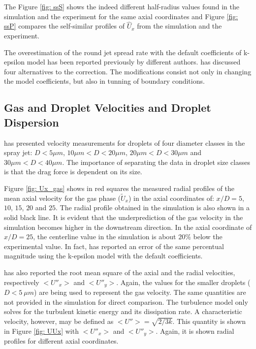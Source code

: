 \documentclass[preprint,12pt,review]{elsarticle}
\begin{document}
The Figure \ref{fig: ssS} shows the indeed different half-radius values found in the simulation and the experiment for the same axial coordinates and Figure \ref{fig: ssP} compares the self-similar profiles of $\hat{U}_x$ from the simulation and the experiment.

The overestimation of the round jet spread rate with the default coefficients of k-epsilon model has been reported previously by different authors. \citet{luppes} has discussed four alternatives to the correction. The modifications consist not only in changing the model coefficients, but also in tunning of boundary conditions. 

\subsection{Gas and Droplet Velocities and Droplet Dispersion}

\citet{chen} has presented velocity measurements for droplets of four diameter classes in the spray jet: $D< 5\mu m$, $10\mu m <D<20\mu m$, $20 \mu m < D < 30 \mu m$ and $30 \mu m < D < 40 \mu m$. The importance of separating the data in droplet size classes is that the drag force is dependent on its size. 

Figure \ref{fig: Ux_gas} shows in red squares the measured radial profiles of the mean axial velocity for the gas phase ($\tilde{U}_x$) in the axial coordinates of: $x/D=5$, $10$, $15$, $20$ and $25$. The radial profile obtained in the simulation is also shown in a solid black line. It is evident that the underprediction of the gas velocity in the simulation becomes higher in the downstream direction. In the axial coordinate of $x/D=25$, the centerline value in the simulation is about $20\%$ below the experimental value. In fact, \citet{luppes} has reported an error of the same percentual magnitude using the k-epsilon model with the default coefficients. 

\citet{chen} has also reported the root mean square of the axial and the radial velocities, respectively $<U''_x>$ and $<U''_y>$. Again, the values for the smaller droplets ($D< 5\ \mu m$) are being used to represent the gas velocity. The same quantities are not provided in the simulation for direct comparison. The turbulence model only solves for the turbulent kinetic energy and its dissipation rate. A characteristic velocity, however, may be defined as $<U''>=\sqrt{2/3 k}$. This quantity is shown in Figure \ref{fig: UUx} with $<U''_x>$ and $<U''_y>$. Again, it is shown radial profiles for different axial coordinates.
\end{document}
